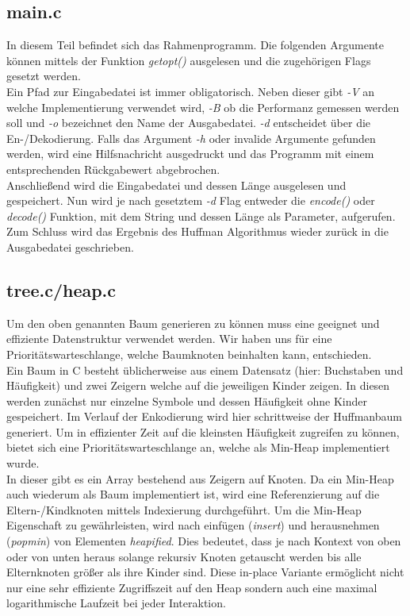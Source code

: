 \documentclass[course=erap]{aspdoc}
\begin{document}
\subsection{main.c}
In diesem Teil befindet sich das Rahmenprogramm. Die folgenden Argumente können mittels der Funktion \textit{getopt()} ausgelesen und die zugehörigen Flags gesetzt werden.\\
Ein Pfad zur Eingabedatei ist immer obligatorisch. Neben dieser gibt \textit{-V} an welche Implementierung verwendet wird, \textit{-B} ob die Performanz gemessen werden soll und \textit{-o} bezeichnet den Name der Ausgabedatei. \textit{-d} entscheidet über die En-/Dekodierung. Falls das Argument \textit{-h} oder invalide Argumente gefunden werden, wird eine Hilfsnachricht ausgedruckt und das Programm mit einem entsprechenden Rückgabewert abgebrochen.\\
Anschließend wird die Eingabedatei und dessen Länge ausgelesen und gespeichert. Nun wird je nach gesetztem \textit{-d} Flag entweder die \textit{encode()} oder \textit{decode()} Funktion, mit dem String und dessen Länge als Parameter, aufgerufen.
Zum Schluss wird das Ergebnis des Huffman Algorithmus wieder zurück in die Ausgabedatei geschrieben.

\subsection{tree.c/heap.c}
Um den oben genannten Baum generieren zu können muss eine geeignet und effiziente Datenstruktur verwendet werden. Wir haben uns für eine Prioritätswarteschlange, welche Baumknoten beinhalten kann, entschieden.\\
Ein Baum in C besteht üblicherweise aus einem Datensatz (hier: Buchstaben und Häufigkeit) und zwei Zeigern welche auf die jeweiligen Kinder zeigen. In diesen werden zunächst nur einzelne Symbole und dessen Häufigkeit ohne Kinder gespeichert. Im Verlauf der Enkodierung wird hier schrittweise der Huffmanbaum generiert. Um in effizienter Zeit auf die kleinsten Häufigkeit zugreifen zu können, bietet sich eine Prioritätswarteschlange an, welche als Min-Heap implementiert wurde.\\
In dieser gibt es ein Array bestehend aus Zeigern auf Knoten. Da ein Min-Heap auch wiederum als Baum implementiert ist, wird eine Referenzierung auf die Eltern-/Kindknoten mittels Indexierung durchgeführt. Um die Min-Heap Eigenschaft zu gewährleisten, wird nach einfügen (\textit{insert}) und herausnehmen (\textit{pop\textunderscore min}) von Elementen \textit{heapified}. Dies bedeutet, dass je nach Kontext von oben oder von unten heraus solange rekursiv Knoten getauscht werden bis alle Elternknoten größer als ihre Kinder sind. Diese in-place Variante ermöglicht nicht nur eine sehr effiziente Zugriffszeit auf den Heap sondern auch eine maximal logarithmische Laufzeit bei jeder Interaktion.
\end{document}
